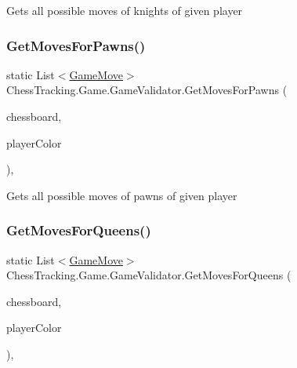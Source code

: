 Gets all possible moves of knights of given player 

\mbox{\label{class_chess_tracking_1_1_game_1_1_game_validator_ae326494a4a16d134e06c1fdcfa664e31}} 
\subsubsection{\texorpdfstring{GetMovesForPawns()}{GetMovesForPawns()}}
{\footnotesize\ttfamily static List$<$\mbox{\hyperlink{class_chess_tracking_1_1_game_1_1_game_move}{Game\+Move}}$>$ Chess\+Tracking.\+Game.\+Game\+Validator.\+Get\+Moves\+For\+Pawns (\begin{DoxyParamCaption}\item[{\mbox{\hyperlink{class_chess_tracking_1_1_game_1_1_chessboard_model}{Chessboard\+Model}}}]{chessboard,  }\item[{\mbox{\hyperlink{namespace_chess_tracking_1_1_game_ab79070a55977a8c8326e9cdda7dcfa9a}{Player\+Color}}}]{player\+Color }\end{DoxyParamCaption})\hspace{0.3cm}{\ttfamily [static]}, {\ttfamily [private]}}



Gets all possible moves of pawns of given player 

\mbox{\label{class_chess_tracking_1_1_game_1_1_game_validator_afd2936714cc765530dc2208304d29c1d}} 
\subsubsection{\texorpdfstring{GetMovesForQueens()}{GetMovesForQueens()}}
{\footnotesize\ttfamily static List$<$\mbox{\hyperlink{class_chess_tracking_1_1_game_1_1_game_move}{Game\+Move}}$>$ Chess\+Tracking.\+Game.\+Game\+Validator.\+Get\+Moves\+For\+Queens (\begin{DoxyParamCaption}\item[{\mbox{\hyperlink{class_chess_tracking_1_1_game_1_1_chessboard_model}{Chessboard\+Model}}}]{chessboard,  }\item[{\mbox{\hyperlink{namespace_chess_tracking_1_1_game_ab79070a55977a8c8326e9cdda7dcfa9a}{Player\+Color}}}]{player\+Color }\end{DoxyParamCaption})\hspace{0.3cm}{\ttfamily [static]}, {\ttfamily [private]}}



